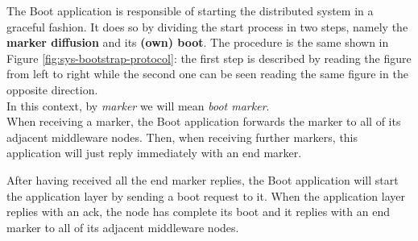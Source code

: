 \label{sec:mw-boot-descr}

The Boot application is responsible of starting the distributed
system in a graceful fashion.
It does so by dividing the start process in two steps, namely the
\textbf{marker diffusion} and its \textbf{(own) boot}. The procedure is
the same shown in Figure \ref{fig:sys-bootstrap-protocol}: the first step
is described by reading the figure from left to right
while the second one can be seen reading the same figure
in the opposite direction.
\\

In this context, by \textit{marker} we will mean \textit{boot marker}.
\\

When receiving a marker, the Boot application forwards the marker to all
of its adjacent middleware nodes.
Then, when receiving further markers, this application will just reply
immediately with an end marker.

After having received all the end marker replies,
the Boot application will start the application layer
by sending a boot request to it.
When the application layer replies with an ack, the node has complete its boot
and it replies with an end marker to all of its adjacent middleware nodes.
